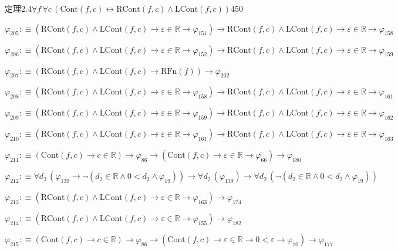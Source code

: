 \begin{fullproof}{定理2.4}{$\forall f\,\forall c\,(\mathrm{Cont}(f,c) \leftrightarrow \mathrm{RCont}(f,c) \land \mathrm{LCont}(f,c))$}{450}
\begin{abbrevlist}
\item $\varphi_{205} :\equiv (\mathrm{RCont}(f,c) \land \mathrm{LCont}(f,c) \to \varepsilon \in \mathbb{R} \to \varphi_{151}) \to \mathrm{RCont}(f,c) \land \mathrm{LCont}(f,c) \to \varepsilon \in \mathbb{R} \to \varphi_{158}$
\item $\varphi_{206} :\equiv (\mathrm{RCont}(f,c) \land \mathrm{LCont}(f,c) \to \varepsilon \in \mathbb{R} \to \varphi_{152}) \to \mathrm{RCont}(f,c) \land \mathrm{LCont}(f,c) \to \varepsilon \in \mathbb{R} \to \varphi_{159}$
\item $\varphi_{207} :\equiv (\mathrm{RCont}(f,c) \land \mathrm{LCont}(f,c) \to \mathrm{RFn}(f)) \to \varphi_{202}$
\item $\varphi_{208} :\equiv (\mathrm{RCont}(f,c) \land \mathrm{LCont}(f,c) \to \varepsilon \in \mathbb{R} \to \varphi_{158}) \to \mathrm{RCont}(f,c) \land \mathrm{LCont}(f,c) \to \varepsilon \in \mathbb{R} \to \varphi_{161}$
\item $\varphi_{209} :\equiv (\mathrm{RCont}(f,c) \land \mathrm{LCont}(f,c) \to \varepsilon \in \mathbb{R} \to \varphi_{159}) \to \mathrm{RCont}(f,c) \land \mathrm{LCont}(f,c) \to \varepsilon \in \mathbb{R} \to \varphi_{162}$
\item $\varphi_{210} :\equiv (\mathrm{RCont}(f,c) \land \mathrm{LCont}(f,c) \to \varepsilon \in \mathbb{R} \to \varphi_{161}) \to \mathrm{RCont}(f,c) \land \mathrm{LCont}(f,c) \to \varepsilon \in \mathbb{R} \to \varphi_{163}$
\item $\varphi_{211} :\equiv (\mathrm{Cont}(f,c) \to c \in \mathbb{R}) \to \varphi_{86} \to (\mathrm{Cont}(f,c) \to \varepsilon \in \mathbb{R} \to \varphi_{66}) \to \varphi_{180}$
\item $\varphi_{212} :\equiv \forall d_{2}\,(\varphi_{139} \to \neg (d_{2} \in \mathbb{R} \land 0 < d_{2} \land \varphi_{19})) \to \forall d_{2}\,(\varphi_{139}) \to \forall d_{2}\,(\neg (d_{2} \in \mathbb{R} \land 0 < d_{2} \land \varphi_{19}))$
\item $\varphi_{213} :\equiv (\mathrm{RCont}(f,c) \land \mathrm{LCont}(f,c) \to \varepsilon \in \mathbb{R} \to \varphi_{163}) \to \varphi_{174}$
\item $\varphi_{214} :\equiv (\mathrm{RCont}(f,c) \land \mathrm{LCont}(f,c) \to \varepsilon \in \mathbb{R} \to \varphi_{155}) \to \varphi_{182}$
\item $\varphi_{215} :\equiv (\mathrm{Cont}(f,c) \to c \in \mathbb{R}) \to \varphi_{86} \to (\mathrm{Cont}(f,c) \to \varepsilon \in \mathbb{R} \to 0 < \varepsilon \to \varphi_{70}) \to \varphi_{177}$

\end{abbrevlist}
\end{fullproof}
